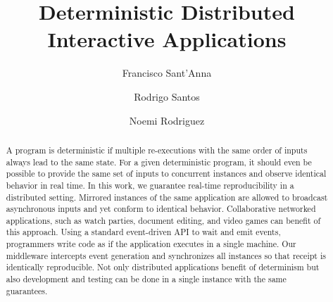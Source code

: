 \documentclass[sigplan,screen]{acmart}
\begin{document}
\title{Deterministic Distributed Interactive Applications}

\author{Francisco Sant'Anna}

\author{Rodrigo Santos}

\author{Noemi Rodriguez}


\begin{abstract}
A program is deterministic if multiple re-executions with the same order of
inputs always lead to the same state.
For a given deterministic program, it should even be possible to provide the
same set of inputs to concurrent instances and observe identical behavior in
real time.
%
In this work, we guarantee real-time reproducibility in a distributed setting.
Mirrored instances of the same application are allowed to broadcast
asynchronous inputs and yet conform to identical behavior.
Collaborative networked applications, such as watch parties, document editing,
and video games can benefit of this approach.
%
Using a standard event-driven API to wait and emit events, programmers write
code as if the application executes in a single machine.
Our middleware intercepts event generation and synchronizes all instances so
that receipt is identically reproducible.
Not only distributed applications benefit of determinism but also development
and testing can be done in a single instance with the same guarantees.
\end{abstract}

\maketitle
\end{document}
